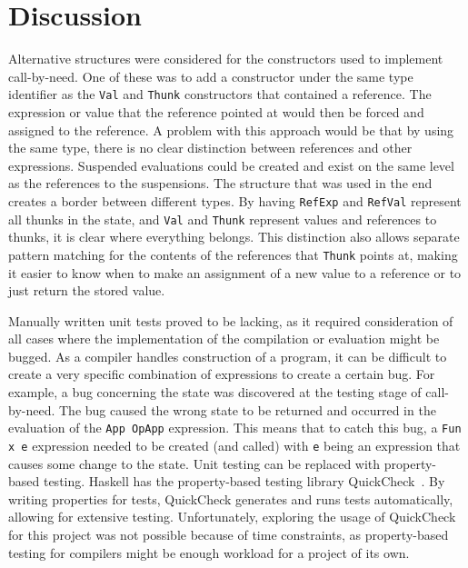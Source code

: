 \section{Discussion}
Alternative structures were considered for the constructors used to implement
call-by-need. One of these was to add a constructor under the same type
identifier as the \texttt{Val} and \texttt{Thunk} constructors that contained
a reference. The expression or value that the reference pointed at would then be
forced and assigned to the reference. A problem with this approach would be
that by using the same type, there is no clear distinction between references
and other expressions. Suspended evaluations could be created and exist on the
same level as the references to the suspensions. The structure that was used in
the end creates a border between different types. By having \texttt{RefExp} and
\texttt{RefVal} represent all thunks in the state, and \texttt{Val} and
\texttt{Thunk} represent values and references to thunks,
it is clear where everything belongs. This
distinction also allows separate pattern matching for the contents of the
references that \texttt{Thunk} points at, making it easier to know when to
make an assignment of a new value to a reference or to just return the stored
value.

Manually written unit tests proved to be lacking, as it required consideration 
of all cases where the implementation of the compilation or evaluation might be
bugged. As a compiler handles construction of a program, it can be difficult to
create a very specific combination of expressions to create a certain bug.
For example, a bug concerning the state was discovered at the testing stage
of call-by-need. The bug caused the wrong state to be returned and occurred in
the evaluation of the \texttt{App OpApp} expression. This means that to catch
this bug, a \texttt{Fun x e} expression needed to be created (and called) with
\texttt{e} being an expression that causes some change to the state. Unit
testing can be replaced with property-based testing. Haskell has the
property-based testing library QuickCheck~\cite{Introduc44:online}. By writing
properties for tests, QuickCheck generates and runs tests automatically,
allowing for extensive testing. Unfortunately, exploring the usage of QuickCheck
for this project was not possible because of time constraints, as property-based
testing for compilers might be enough workload for a project of its own.





